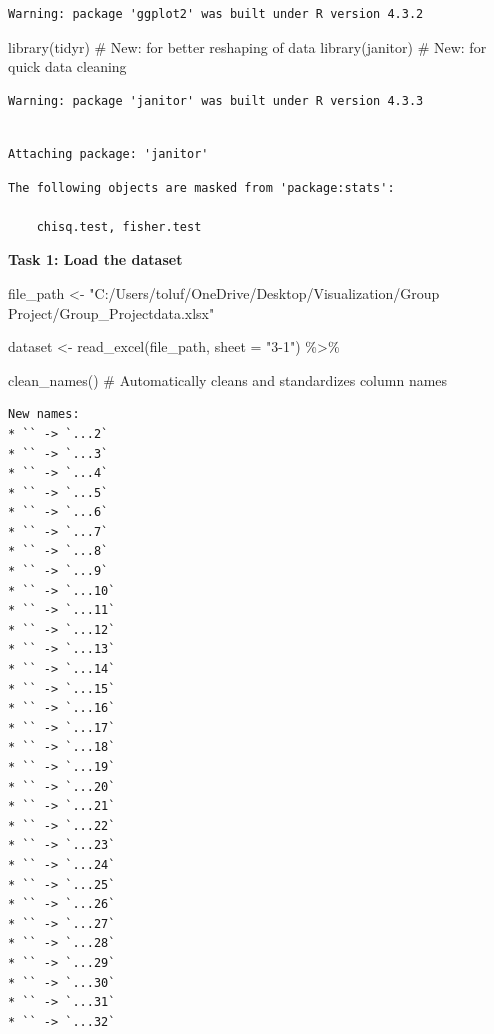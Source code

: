 \documentclass[
  letterpaper,
  DIV=11,
  numbers=noendperiod]{scrreprt}
\newenvironment{Shaded}{\begin{snugshade}}{\end{snugshade}}
\newcommand{\AttributeTok}[1]{\textcolor[rgb]{0.40,0.45,0.13}{#1}}
\newcommand{\CommentTok}[1]{\textcolor[rgb]{0.37,0.37,0.37}{#1}}
\newcommand{\FunctionTok}[1]{\textcolor[rgb]{0.28,0.35,0.67}{#1}}
\newcommand{\NormalTok}[1]{\textcolor[rgb]{0.00,0.23,0.31}{#1}}
\newcommand{\OtherTok}[1]{\textcolor[rgb]{0.00,0.23,0.31}{#1}}
\newcommand{\SpecialCharTok}[1]{\textcolor[rgb]{0.37,0.37,0.37}{#1}}
\newcommand{\StringTok}[1]{\textcolor[rgb]{0.13,0.47,0.30}{#1}}
\begin{document}
\begin{verbatim}
Warning: package 'ggplot2' was built under R version 4.3.2
\end{verbatim}

\begin{Shaded}
\begin{Highlighting}[]
\FunctionTok{library}\NormalTok{(tidyr)  }\CommentTok{\# New: for better reshaping of data}
\FunctionTok{library}\NormalTok{(janitor) }\CommentTok{\# New: for quick data cleaning}
\end{Highlighting}
\end{Shaded}

\begin{verbatim}
Warning: package 'janitor' was built under R version 4.3.3
\end{verbatim}

\begin{verbatim}

Attaching package: 'janitor'
\end{verbatim}

\begin{verbatim}
The following objects are masked from 'package:stats':

    chisq.test, fisher.test
\end{verbatim}

\textbf{Task 1: Load the dataset}

\begin{Shaded}
\begin{Highlighting}[]
\NormalTok{file\_path }\OtherTok{\textless{}{-}} \StringTok{"C:/Users/toluf/OneDrive/Desktop/Visualization/Group Project/Group\_Projectdata.xlsx"}

\NormalTok{dataset }\OtherTok{\textless{}{-}} \FunctionTok{read\_excel}\NormalTok{(file\_path, }\AttributeTok{sheet =} \StringTok{"3{-}1"}\NormalTok{) }\SpecialCharTok{\%\textgreater{}\%} 

  \FunctionTok{clean\_names}\NormalTok{()  }\CommentTok{\# Automatically cleans and standardizes column names}
\end{Highlighting}
\end{Shaded}

\begin{verbatim}
New names:
* `` -> `...2`
* `` -> `...3`
* `` -> `...4`
* `` -> `...5`
* `` -> `...6`
* `` -> `...7`
* `` -> `...8`
* `` -> `...9`
* `` -> `...10`
* `` -> `...11`
* `` -> `...12`
* `` -> `...13`
* `` -> `...14`
* `` -> `...15`
* `` -> `...16`
* `` -> `...17`
* `` -> `...18`
* `` -> `...19`
* `` -> `...20`
* `` -> `...21`
* `` -> `...22`
* `` -> `...23`
* `` -> `...24`
* `` -> `...25`
* `` -> `...26`
* `` -> `...27`
* `` -> `...28`
* `` -> `...29`
* `` -> `...30`
* `` -> `...31`
* `` -> `...32`
\end{verbatim}
\end{document}
